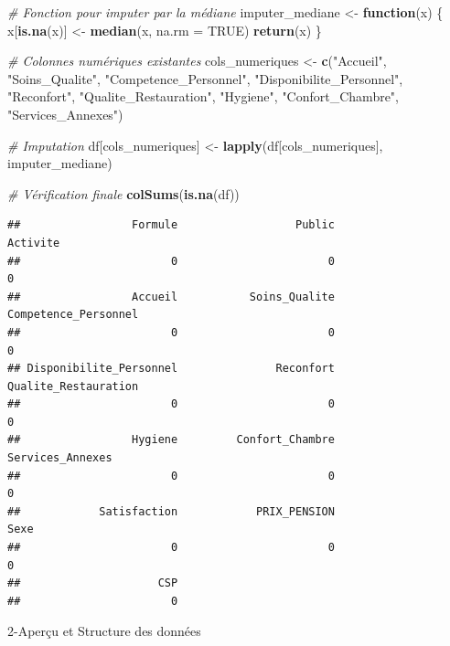 \documentclass[
]{article}
\newenvironment{Shaded}{\begin{snugshade}}{\end{snugshade}}
\newcommand{\AttributeTok}[1]{\textcolor[rgb]{0.13,0.29,0.53}{#1}}
\newcommand{\CommentTok}[1]{\textcolor[rgb]{0.56,0.35,0.01}{\textit{#1}}}
\newcommand{\ConstantTok}[1]{\textcolor[rgb]{0.56,0.35,0.01}{#1}}
\newcommand{\ControlFlowTok}[1]{\textcolor[rgb]{0.13,0.29,0.53}{\textbf{#1}}}
\newcommand{\FunctionTok}[1]{\textcolor[rgb]{0.13,0.29,0.53}{\textbf{#1}}}
\newcommand{\NormalTok}[1]{#1}
\newcommand{\OtherTok}[1]{\textcolor[rgb]{0.56,0.35,0.01}{#1}}
\newcommand{\StringTok}[1]{\textcolor[rgb]{0.31,0.60,0.02}{#1}}
\begin{document}
\begin{Shaded}
\begin{Highlighting}[]
\CommentTok{\# Fonction pour imputer par la médiane}
\NormalTok{imputer\_mediane }\OtherTok{\textless{}{-}} \ControlFlowTok{function}\NormalTok{(x) \{}
\NormalTok{  x[}\FunctionTok{is.na}\NormalTok{(x)] }\OtherTok{\textless{}{-}} \FunctionTok{median}\NormalTok{(x, }\AttributeTok{na.rm =} \ConstantTok{TRUE}\NormalTok{)}
  \FunctionTok{return}\NormalTok{(x)}
\NormalTok{\}}

\CommentTok{\# Colonnes numériques existantes}
\NormalTok{cols\_numeriques }\OtherTok{\textless{}{-}} \FunctionTok{c}\NormalTok{(}\StringTok{"Accueil"}\NormalTok{, }\StringTok{"Soins\_Qualite"}\NormalTok{, }\StringTok{"Competence\_Personnel"}\NormalTok{, }
                     \StringTok{"Disponibilite\_Personnel"}\NormalTok{, }\StringTok{"Reconfort"}\NormalTok{, }
                     \StringTok{"Qualite\_Restauration"}\NormalTok{, }\StringTok{"Hygiene"}\NormalTok{, }\StringTok{"Confort\_Chambre"}\NormalTok{, }
                     \StringTok{"Services\_Annexes"}\NormalTok{)}

\CommentTok{\# Imputation}
\NormalTok{df[cols\_numeriques] }\OtherTok{\textless{}{-}} \FunctionTok{lapply}\NormalTok{(df[cols\_numeriques], imputer\_mediane)}

\CommentTok{\# Vérification finale}
\FunctionTok{colSums}\NormalTok{(}\FunctionTok{is.na}\NormalTok{(df))}
\end{Highlighting}
\end{Shaded}

\begin{verbatim}
##                 Formule                  Public                Activite 
##                       0                       0                       0 
##                 Accueil           Soins_Qualite    Competence_Personnel 
##                       0                       0                       0 
## Disponibilite_Personnel               Reconfort    Qualite_Restauration 
##                       0                       0                       0 
##                 Hygiene         Confort_Chambre        Services_Annexes 
##                       0                       0                       0 
##            Satisfaction            PRIX_PENSION                    Sexe 
##                       0                       0                       0 
##                     CSP 
##                       0
\end{verbatim}

2-Aperçu et Structure des données
\end{document}
